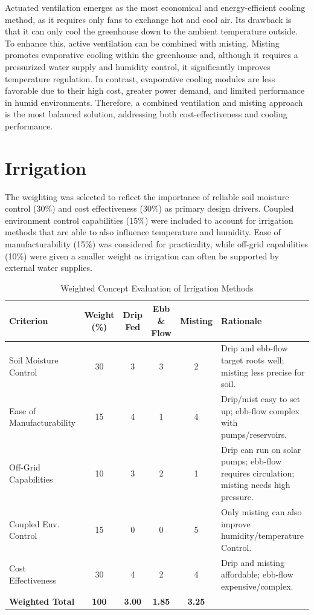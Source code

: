 Actuated ventilation emerges as the most economical and energy-efficient cooling method, as it requires only fans to exchange hot and cool air. Its drawback is that it can only cool the greenhouse down to the ambient temperature outside. To enhance this, active ventilation can be combined with misting. Misting promotes evaporative cooling within the greenhouse and, although it requires a pressurized water supply and humidity control, it significantly improves temperature regulation. In contrast, evaporative cooling modules are less favorable due to their high cost, greater power demand, and limited performance in humid environments. Therefore, a combined ventilation and misting approach is the most balanced solution, addressing both cost-effectiveness and cooling performance.

\section{Irrigation}

The weighting was selected to reflect the importance of reliable soil moisture control (30\%) and cost effectiveness (30\%) as primary design drivers. Coupled environment control capabilities (15\%) were included to account for irrigation methods that are able to also influence temperature and humidity. Ease of manufacturability (15\%) was considered for practicality, while off-grid capabilities (10\%) were given a smaller weight as irrigation can often be supported by external water supplies.

\begin{table}[H]
	\centering
	\begingroup
	\small
	\renewcommand{\arraystretch}{1.2}
	\setlength{\tabcolsep}{3pt}
	\begin{tabularx}{\textwidth}{|p{3.6cm}|c|c|c|c|X|}
		\hline
		\textbf{Criterion} & \textbf{Weight (\%)} & \textbf{Drip Fed} & \textbf{Ebb \& Flow} & \textbf{Misting} & \textbf{Rationale} \\
		\hline
		Soil Moisture Control & 30 & 3 & 3 & 2 & Drip and ebb-flow target roots well; misting less precise for soil. \\
		\hline
		Ease of Manufacturability & 15 & 4 & 1 & 4 & Drip/mist easy to set up; ebb-flow complex with pumps/reservoirs. \\
		\hline
		Off-Grid Capabilities & 10 & 3 & 2 & 1 & Drip can run on solar pumps; ebb-flow requires circulation; misting needs high pressure. \\
		\hline
		Coupled Env. Control & 15 & 0 & 0 & 5 & Only misting can also improve humidity/temperature Control. \\
		\hline
		Cost Effectiveness & 30 & 4 & 2 & 4 & Drip and misting affordable; ebb-flow expensive/complex. \\
		\hline
		\textbf{Weighted Total} & \textbf{100} & \textbf{3.00} & \textbf{1.85} & \textbf{3.25} & \\
		\hline
	\end{tabularx}
	\caption{Weighted Concept Evaluation of Irrigation Methods}
	\label{tab:irrigation_evaluation}
	\endgroup
\end{table}

